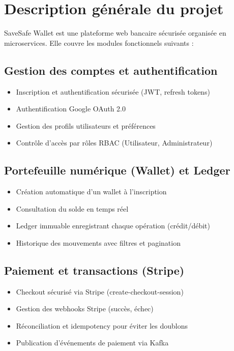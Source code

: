 \documentclass[12pt,a4paper]{report}
\begin{document}
\section{Description générale du projet}
SaveSafe Wallet est une plateforme web bancaire sécurisée organisée en microservices. Elle couvre les modules fonctionnels suivants :

\subsection*{Gestion des comptes et authentification}
\begin{itemize}[leftmargin=*,label=--]
\item Inscription et authentification sécurisée (JWT, refresh tokens)
\item Authentification Google OAuth 2.0
\item Gestion des profils utilisateurs et préférences
\item Contrôle d'accès par rôles RBAC (Utilisateur, Administrateur)
\end{itemize}

\subsection*{Portefeuille numérique (Wallet) et Ledger}
\begin{itemize}[leftmargin=*,label=--]
\item Création automatique d'un wallet à l'inscription
\item Consultation du solde en temps réel
\item Ledger immuable enregistrant chaque opération (crédit/débit)
\item Historique des mouvements avec filtres et pagination
\end{itemize}

\subsection*{Paiement et transactions (Stripe)}
\begin{itemize}[leftmargin=*,label=--]
\item Checkout sécurisé via Stripe (create-checkout-session)
\item Gestion des webhooks Stripe (succès, échec)
\item Réconciliation et idempotency pour éviter les doublons
\item Publication d'événements de paiement via Kafka
\end{itemize}
\end{document}
